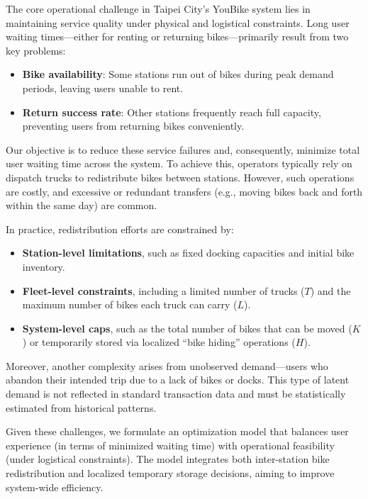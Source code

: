 \documentclass[11pt,a4paper]{article}
\begin{document}
The core operational challenge in Taipei City's YouBike system lies in maintaining service quality under physical and logistical constraints. Long user waiting times—either for renting or returning bikes—primarily result from two key problems:

\begin{itemize}
    \item \textbf{Bike availability}: Some stations run out of bikes during peak demand periods, leaving users unable to rent.
    \item \textbf{Return success rate}: Other stations frequently reach full capacity, preventing users from returning bikes conveniently.
\end{itemize}

Our objective is to reduce these service failures and, consequently, minimize total user waiting time across the system. To achieve this, operators typically rely on dispatch trucks to redistribute bikes between stations. However, such operations are costly, and excessive or redundant transfers (e.g., moving bikes back and forth within the same day) are common.

In practice, redistribution efforts are constrained by:
\begin{itemize}
    \item \textbf{Station-level limitations}, such as fixed docking capacities and initial bike inventory.
    \item \textbf{Fleet-level constraints}, including a limited number of trucks ($T$) and the maximum number of bikes each truck can carry ($L$).
    \item \textbf{System-level caps}, such as the total number of bikes that can be moved ($K$) or temporarily stored via localized “bike hiding” operations ($H$).
\end{itemize}

Moreover, another complexity arises from unobserved demand—users who abandon their intended trip due to a lack of bikes or docks. This type of latent demand is not reflected in standard transaction data and must be statistically estimated from historical patterns.

Given these challenges, we formulate an optimization model that balances user experience (in terms of minimized waiting time) with operational feasibility (under logistical constraints). The model integrates both inter-station bike redistribution and localized temporary storage decisions, aiming to improve system-wide efficiency.
\end{document}

